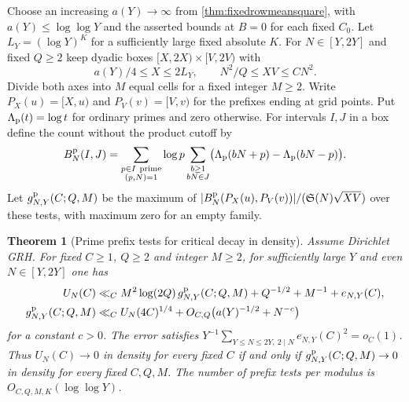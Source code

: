 \documentclass[11pt,a4paper]{article}
\numberwithin{equation}{section}
\newtheorem{theorem}{Theorem}[section]
\newcommand{\SSS}{\mathfrak S}
\begin{document}
Choose an increasing $a(Y)\to\infty$ from
\cref{thm:fixedrowmeansquare}, with $a(Y)\le\log\log Y$
and the asserted bounds at $B=0$ for each fixed
$C_0$. Let $L_Y=(\log Y)^K$ for a sufficiently large
fixed absolute $K$. For $N\in[Y,2Y]$ and fixed $Q\ge2$
keep dyadic boxes $[X,2X)\times[V,2V)$ with
\begin{equation}
 a(Y)/4\le X\le2L_Y,\qquad N^2/Q\le XV\le CN^2.
 \label{eq:criticalmeangridscales}
\end{equation}
Divide both axes into $M$ equal cells for a fixed
integer $M\ge2$. Write $P_X(u)=[X,u)$ and
$P_V(v)=[V,v)$ for the prefixes ending at grid points.
Put $\Lambda_{\rm p}(t)=\log t$ for ordinary primes
and zero otherwise. For intervals $I,J$ in a box define
the count without the product cutoff by
\[
 B_N^{\rm p}(I,J)=
 \sum_{\substack{p\in I\ {\rm prime}\\(p,N)=1}}\log p
 \sum_{\substack{b\ge1\\bN\in J}}
       \bigl(\Lambda_{\rm p}(bN+p)-\Lambda_{\rm p}(bN-p)\bigr).
\]
Let $g_{N,Y}^{\rm p}(C;Q,M)$ be the maximum of
$|B_N^{\rm p}(P_X(u),P_V(v))|/(\SSS(N)\sqrt{XV})$
over these tests, with maximum zero for an empty family.

\begin{theorem}[Prime prefix tests for critical decay in density]
\label{thm:criticalmeangrid}
Assume Dirichlet GRH. For fixed $C\ge1$, $Q\ge2$
and integer $M\ge2$, for sufficiently large $Y$ and
even $N\in[Y,2Y]$ one has
\begin{align}
 U_N(C)&\ll_C M^2\log(2Q)\,g_{N,Y}^{\rm p}(C;Q,M)
       +Q^{-1/2}+M^{-1}+e_{N,Y}(C), \label{eq:criticalmeangridupper}\\
 g_{N,Y}^{\rm p}(C;Q,M)&\ll_C U_N(4C)^{1/4}
       +O_{C,Q}\bigl(a(Y)^{-1/2}+N^{-c}\bigr)
       \label{eq:criticalmeangridlower}
\end{align}
for a constant $c>0$. The error satisfies
$Y^{-1}\sum_{Y\le N\le2Y,\ 2\mid N}e_{N,Y}(C)^2=o_C(1)$.
Thus $U_N(C)\to0$ in density for every fixed $C$
if and only if $g_{N,Y}^{\rm p}(C;Q,M)\to0$ in density
for every fixed $C,Q,M$. The number of prefix tests
per modulus is $O_{C,Q,M,K}(\log\log Y)$.
\end{theorem}
\end{document}

